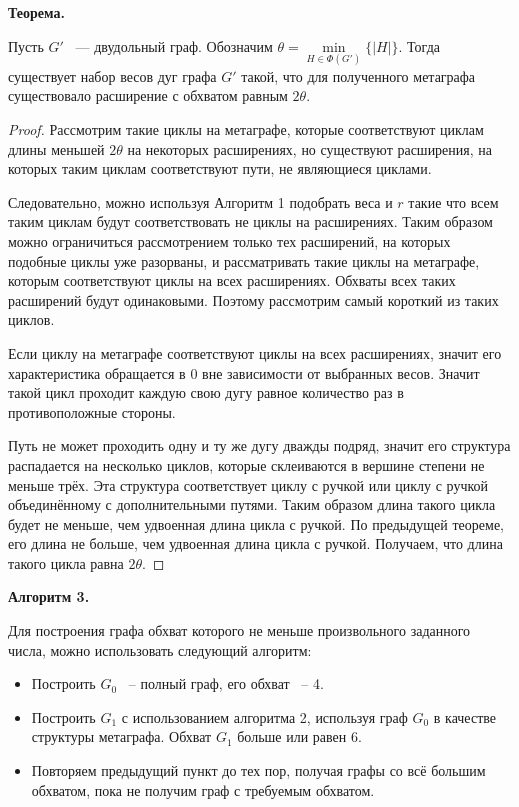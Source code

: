 \documentclass[14pt]{mmcs-article}
\begin{document}
\textbf{Теорема.}

Пусть $G'$ ~--- двудольный граф. Обозначим $\theta = \min\limits_{H \in \Phi(G')} \{ |H| \}$. Тогда существует набор весов дуг графа $G'$ такой, что для полученного метаграфа существовало расширение с обхватом равным $2 \theta$.

\begin{proof}

Рассмотрим такие циклы на метаграфе, которые соответствуют циклам длины меньшей $2 \theta$ на некоторых расширениях, но существуют расширения, на которых таким циклам соответствуют пути, не являющиеся циклами.

Следовательно, можно используя Алгоритм 1 подобрать веса и $r$ такие что всем таким циклам будут соответствовать не циклы на расширениях. Таким образом можно ограничиться рассмотрением только тех расширений, на которых подобные циклы уже разорваны,  и рассматривать такие циклы на метаграфе, которым соответствуют циклы на всех расширениях. Обхваты всех таких расширений будут одинаковыми. Поэтому рассмотрим самый короткий из таких циклов.

Если циклу на метаграфе соответствуют циклы на всех расширениях, значит его характеристика обращается в $0$ вне зависимости от выбранных весов. Значит такой цикл проходит каждую свою дугу равное количество раз в противоположные стороны. 

Путь не может проходить одну и ту же дугу дважды подряд, значит его структура распадается на несколько циклов, которые склеиваются в вершине степени не меньше трёх. Эта структура соответствует циклу с ручкой или циклу с ручкой объединённому с дополнительными путями. Таким образом длина такого цикла будет не меньше, чем удвоенная длина цикла с ручкой. По предыдущей теореме, его длина не больше, чем удвоенная длина цикла с ручкой. Получаем, что длина такого цикла равна $2 \theta$.

\end{proof}

\textbf{Алгоритм 3.}

Для построения графа обхват которого не меньше произвольного заданного числа, можно использовать следующий алгоритм:

\begin{itemize}
    \item Построить $G_0$ ~-- полный граф, его обхват ~-- 4.
    \item Построить $G_1$ с использованием алгоритма 2, используя граф $G_0$ в качестве структуры метаграфа. Обхват $G_1$ больше или равен 6.
    \item Повторяем предыдущий пункт до тех пор, получая графы со всё большим обхватом, пока не получим граф с требуемым обхватом.  
\end{itemize}
\end{document}
